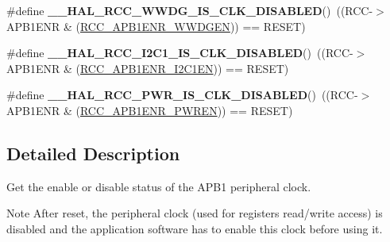 \begin{DoxyCompactItemize}
\#define {\bfseries \+\_\+\+\_\+\+H\+A\+L\+\_\+\+R\+C\+C\+\_\+\+W\+W\+D\+G\+\_\+\+I\+S\+\_\+\+C\+L\+K\+\_\+\+D\+I\+S\+A\+B\+L\+ED}()~((R\+CC-\/$>$A\+P\+B1\+E\+NR \& (\hyperlink{group___peripheral___registers___bits___definition_gaf712b922ee776a972d2efa3da0ea4733}{R\+C\+C\+\_\+\+A\+P\+B1\+E\+N\+R\+\_\+\+W\+W\+D\+G\+EN}))  == R\+E\+S\+ET)
\item 
\mbox{\label{group___r_c_c___a_p_b1___peripheral___clock___enable___disable___status_ga8868ab331b4bb14a1d5cc55c9133e4de}} 
\#define {\bfseries \+\_\+\+\_\+\+H\+A\+L\+\_\+\+R\+C\+C\+\_\+\+I2\+C1\+\_\+\+I\+S\+\_\+\+C\+L\+K\+\_\+\+D\+I\+S\+A\+B\+L\+ED}()~((R\+CC-\/$>$A\+P\+B1\+E\+NR \& (\hyperlink{group___peripheral___registers___bits___definition_ga5ca3afe0c517702b2d1366b692c8db0e}{R\+C\+C\+\_\+\+A\+P\+B1\+E\+N\+R\+\_\+\+I2\+C1\+EN}))  == R\+E\+S\+ET)
\item 
\mbox{\label{group___r_c_c___a_p_b1___peripheral___clock___enable___disable___status_ga1019fdeb30eb4bcb23a0bea2278a94a2}} 
\#define {\bfseries \+\_\+\+\_\+\+H\+A\+L\+\_\+\+R\+C\+C\+\_\+\+P\+W\+R\+\_\+\+I\+S\+\_\+\+C\+L\+K\+\_\+\+D\+I\+S\+A\+B\+L\+ED}()~((R\+CC-\/$>$A\+P\+B1\+E\+NR \& (\hyperlink{group___peripheral___registers___bits___definition_ga5c19997ccd28464b80a7c3325da0ca60}{R\+C\+C\+\_\+\+A\+P\+B1\+E\+N\+R\+\_\+\+P\+W\+R\+EN}))   == R\+E\+S\+ET)
\end{DoxyCompactItemize}


\subsection{Detailed Description}
Get the enable or disable status of the A\+P\+B1 peripheral clock. 

\begin{DoxyNote}{Note}
After reset, the peripheral clock (used for registers read/write access) is disabled and the application software has to enable this clock before using it. 
\end{DoxyNote}

